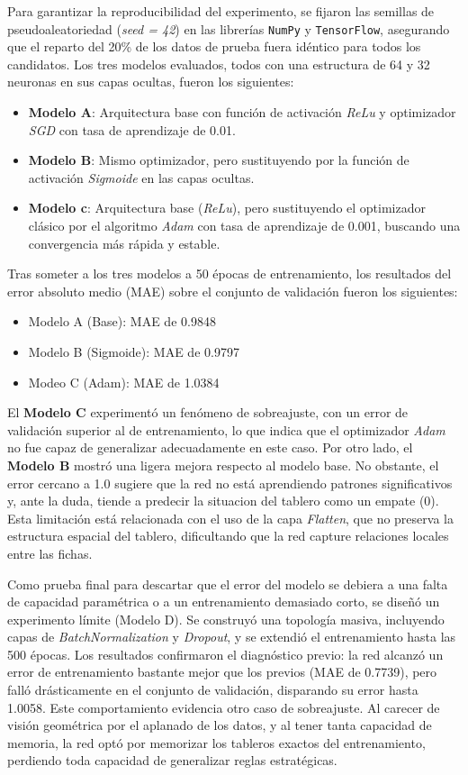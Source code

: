 \documentclass[conference]{IEEEtran}
\begin{document}
Para garantizar la reproducibilidad del experimento, se fijaron las semillas de pseudoaleatoriedad (\textit{seed = 42}) en las librerías \texttt{NumPy} y \texttt{TensorFlow}, 
asegurando que el reparto del 20\% de los datos de prueba fuera idéntico para todos los candidatos. Los tres modelos evaluados, todos con una estructura de 64 y 32 neuronas 
en sus capas ocultas, fueron los siguientes:
\begin{itemize}
    \item \textbf{Modelo A}: Arquitectura base con función de activación \textit{ReLu} y optimizador \textit{SGD} con tasa de aprendizaje de 0.01.
    \item \textbf{Modelo B}: Mismo optimizador, pero sustituyendo  por la función de activación \textit{Sigmoide} en las capas ocultas.
    \item \textbf{Modelo c}: Arquitectura base (\textit{ReLu}), pero sustituyendo el optimizador clásico por el algoritmo \textit{Adam} con tasa de aprendizaje de 0.001, buscando
    una convergencia más rápida y estable.
\end{itemize}

Tras someter a los tres modelos a 50 épocas de entrenamiento, los resultados del error absoluto medio (MAE) sobre el conjunto de validación fueron los siguientes:
\begin{itemize}
    \item Modelo A (Base): MAE de 0.9848
    \item Modelo B (Sigmoide): MAE de 0.9797
    \item Modeo C (Adam): MAE de 1.0384
\end{itemize}

El \textbf{Modelo C} experimentó un fenómeno de sobreajuste, con un error de validación superior al de entrenamiento, lo que indica que el optimizador \textit{Adam} no fue capaz 
de generalizar adecuadamente en este caso. Por otro lado, el \textbf{Modelo B} mostró una ligera mejora respecto al modelo base. No obstante, el error cercano a 1.0 sugiere que
la red no está aprendiendo patrones significativos y, ante la duda, tiende a predecir la situacion del tablero como un empate (0). Esta limitación está relacionada 
con el uso de la capa \textit{Flatten}, que no preserva la estructura espacial del tablero, dificultando que la red capture relaciones locales entre las fichas.

Como prueba final para descartar que el error del modelo se debiera a una falta de capacidad paramétrica o a un entrenamiento demasiado corto, se diseñó un experimento 
límite (Modelo D). Se construyó una topología masiva, incluyendo capas de \textit{BatchNormalization} y \textit{Dropout}, y se extendió el entrenamiento hasta las 500 épocas. 
Los resultados confirmaron el diagnóstico previo: la red alcanzó 
un error de entrenamiento bastante mejor que los previos (MAE de 0.7739), pero falló drásticamente en el conjunto de validación, disparando su error hasta 1.0058. Este comportamiento 
evidencia otro caso de sobreajuste. Al carecer de visión geométrica por el aplanado de los datos, y al tener tanta capacidad de memoria, la red optó por memorizar los tableros 
exactos del entrenamiento, perdiendo toda capacidad de generalizar reglas estratégicas. 
\end{document}
